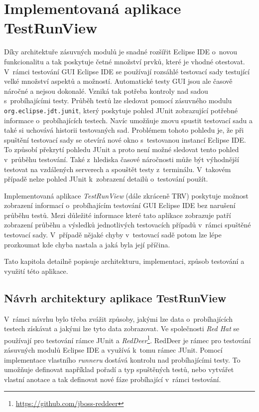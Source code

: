 \chapter{Implementovaná aplikace TestRunView}
\label{chapter:TRV}
Díky architektuře zásuvných modulů je snadné rozšířit Eclipse IDE o~novou funkcionalitu a tak poskytuje četné množství prvků, které je vhodné otestovat. V~rámci testování GUI Eclipse IDE se používají rozsáhlé testovací sady testující velké množství aspektů a možností. Automatické testy GUI jsou ale časově náročné a nejsou dokonalé. Vzniká tak potřeba kontroly nad sadou s~probíhajícími testy. Průběh testů lze sledovat pomocí zásuvného modulu \texttt{org.eclipse.jdt.junit}, který poskytuje pohled JUnit zobrazující potřebné informace o~probíhajících testech. Navíc umožňuje znovu spustit testovací sadu a také si uchovává historii testovaných sad. Problémem tohoto pohledu je, že při spuštění testovací sady se otevírá nové okno s~testovanou instancí Eclipse IDE. To způsobí překrytí pohledu JUnit a proto není možné sledovat tento pohled v~průběhu testování. Také z~hlediska časové náročnosti může být výhodnější testovat na vzdálených serverech a spouštět testy z~terminálu. V~takovém případě nelze pohled JUnit k~zobrazení detailů o~testování použít.

Implementovaná aplikace \emph{TestRunView} (dále zkráceně TRV) poskytuje možnost zobrazení informací o~probíhajícím testování GUI Eclipse IDE bez narušení průběhu testů. Mezi důležité informace které tato aplikace zobrazuje patří zobrazení průběhu a výsledků jednotlivých testovacích případů v~rámci spuštěné testovací sady. V~případě nějaké chyby v~testovací sadě potom lze lépe prozkoumat kde chyba nastala a jaká byla její příčina.

Tato kapitola detailně popisuje architekturu, implementaci, způsob testování a využití této aplikace.

  \section{Návrh architektury aplikace TestRunView}

  V~rámci návrhu bylo třeba zvážit způsoby, jakými lze data o~probíhajících testech získávat a jakými lze tyto data zobrazovat. Ve společnosti \emph{Red Hat} se používají pro testování rámce JUnit a \emph{RedDeer}\footnote{\url{https://github.com/jboss-reddeer}}. RedDeer je rámec pro testování zásuvných modulů Eclipse IDE a využívá k~tomu rámec JUnit. Pomocí implementace vlastního \emph{runneru} dostává kontrolu nad probíhajícími testy. To umožňuje definovat například pořadí a typ spuštěných testů, nebo vytvářet vlastní anotace a tak definovat nové fáze probíhající v~rámci testování.

